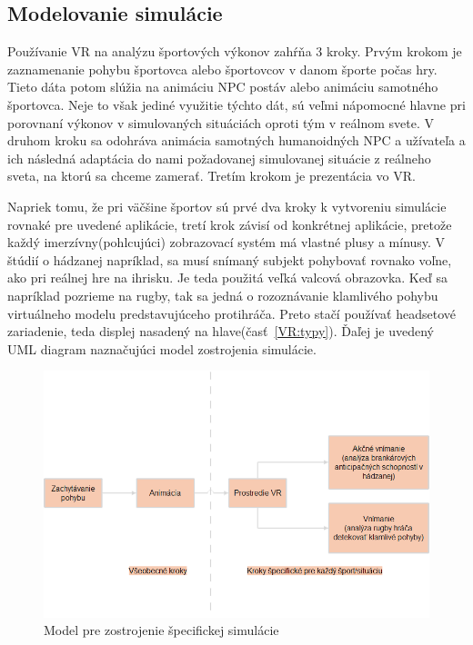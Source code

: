 \documentclass[10pt,twoside,slovak,a4paper]{article}										%
\begin{document}
\subsection{Modelovanie simulácie} \label{SW:model}
Používanie VR na analýzu športových výkonov zahŕňa 3 kroky. Prvým krokom je zaznamenanie pohybu športovca alebo športovcov v danom športe počas hry. Tieto dáta potom slúžia na animáciu NPC postáv alebo animáciu samotného športovca. Neje to však jediné využitie týchto dát, sú veľmi nápomocné hlavne pri porovnaní výkonov v simulovaných situáciách oproti tým v reálnom svete. V druhom kroku sa odohráva animácia samotných humanoidných NPC a užívateľa a ich následná adaptácia do nami požadovanej simulovanej situácie z reálneho sveta, na ktorú sa chceme zamerať. Tretím krokom je prezentácia vo VR.

Napriek tomu, že pri väčšine športov sú prvé dva kroky k vytvoreniu simulácie rovnaké pre uvedené aplikácie, tretí krok závisí od konkrétnej aplikácie, pretože každý imerzívny(pohlcujúci) zobrazovací systém má vlastné plusy a mínusy. V štúdií o hádzanej napríklad, sa musí snímaný subjekt pohybovať rovnako voľne, ako pri reálnej hre na ihrisku. Je teda použitá veľká valcová obrazovka. Keď sa napríklad pozrieme na rugby, tak sa jedná o rozoznávanie klamlivého pohybu virtuálneho modelu predstavujúceho protihráča. Preto stačí používať headsetové zariadenie, teda displej nasadený na hlave(časť~\ref{VR:typy}).
Ďaľej je uvedený UML diagram naznačujúci model zostrojenia simulácie. ~\cite{Hlavny:zdroj}

\clearpage
\begin{figure}[htbp]
\centering
\includegraphics[scale=0.4]{model.png}
\caption{Model pre zostrojenie špecifickej simulácie~\cite{Hlavny:zdroj} }
\label{fig}
\end{figure}
\end{document}

